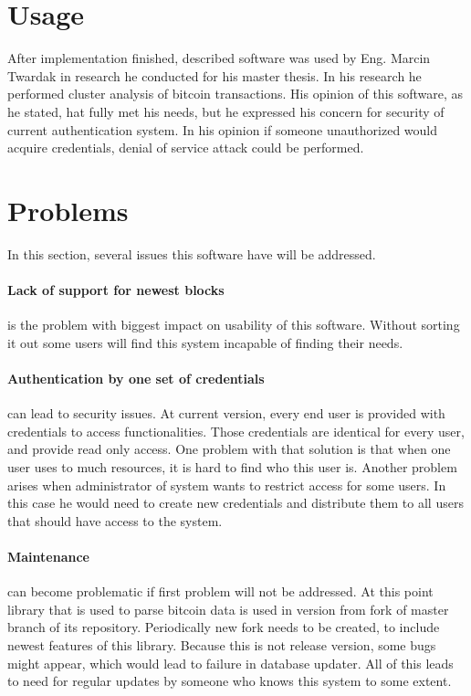 \documentclass[12pt, en, eng, oneside]{mgr}
\begin{document}
\section{Usage}
After implementation finished, described software was used by Eng. Marcin Twardak in research he conducted for his master thesis. In his research he performed cluster analysis of bitcoin transactions. His opinion of this software, as he stated, hat fully met his needs, but he expressed his concern for security of current authentication system. In his opinion if someone unauthorized would acquire credentials, denial of service attack could be performed.

\section{Problems}
In this section, several issues this software have will be addressed.

\paragraph{Lack of support for newest blocks} is the problem with biggest impact on usability of this software. Without sorting it out some users will find this system incapable of finding their needs. 

\paragraph{Authentication by one set of credentials} can lead to security issues. At current version, every end user is provided with credentials to access functionalities. Those credentials are identical for every user, and provide read only access. One problem with that solution is that when one user uses to much resources, it is hard to find who this user is. Another problem arises when administrator of system wants to restrict access for some users. In this case he would need to create new credentials and distribute them to all users that should have access to the system.

\paragraph{Maintenance} can become problematic if first problem will not be addressed. At this point library that is used to parse bitcoin data is used in version from fork of master branch of its repository. Periodically new fork needs to be created, to include newest features of this library. Because this is not release version, some bugs might appear, which would lead to failure in database updater. All of this leads to need for regular updates by someone who knows this system to some extent. 
\end{document}

